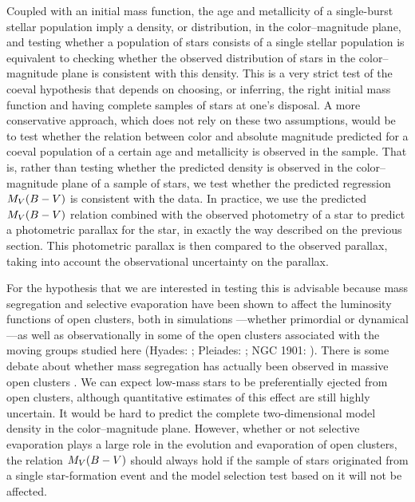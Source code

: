 Coupled with an initial mass function, the age and metallicity of a
single-burst stellar population imply a density, or distribution, in
the color--magnitude plane, and testing whether a population of stars
consists of a single stellar population is equivalent to checking
whether the observed distribution of stars in the color--magnitude
plane is consistent with this density. This is a very strict test of
the coeval hypothesis that depends on choosing, or inferring, the
right initial mass function and having complete samples of stars at
one's disposal. A more conservative approach, which does not rely on
these two assumptions, would be to test whether the relation between
color and absolute magnitude predicted for a coeval population of a
certain age and metallicity is observed in the sample. That is, rather
than testing whether the predicted density is observed in the
color--magnitude plane of a sample of stars, we test whether the
predicted regression $M_V(B-V)$ is consistent with the data. In
practice, we use the predicted $M_V(B-V)$ relation combined with
the observed photometry of a star to predict a photometric parallax
for the star, in exactly the way described on the previous
section. This photometric parallax is then compared to the observed
parallax, taking into account the observational uncertainty on the
parallax.

For the hypothesis that we are interested in testing this is advisable
because mass segregation and selective evaporation have been shown to
affect the luminosity functions of open clusters, both in simulations
\citep{Aarseth72a,Terlevich87a,delafuentemarcos95a,Bonnell98a}---whether
primordial \citep{Bonnell98a,Hillenbrand98a} or dynamical
\citep{McMillan07a,Moeckel09a,Allison09a}---as well as observationally
in some of the open clusters associated with the moving groups studied
here (Hyades:
\citealt{Reid92a,Perryman98a,Reid99a,Dobbie02a,Bouvier08a}; Pleiades:
\citealt{Bouvier98a,Hambly99a,Adams01a}; NGC 1901:
\citealt{Carraro07a}). There is some debate about whether mass
segregation has actually been observed in massive open clusters
\citep{Ascenso09a}. We can expect low-mass stars to be preferentially
ejected from open clusters, although quantitative estimates of this
effect are still highly uncertain. It would be hard to predict the
complete two-dimensional model density in the color--magnitude
plane. However, whether or not selective evaporation plays a large
role in the evolution and evaporation of open clusters, the relation
$M_V(B-V)$ should always hold if the sample of stars originated
from a single star-formation event and the model selection test based
on it will not be affected.

